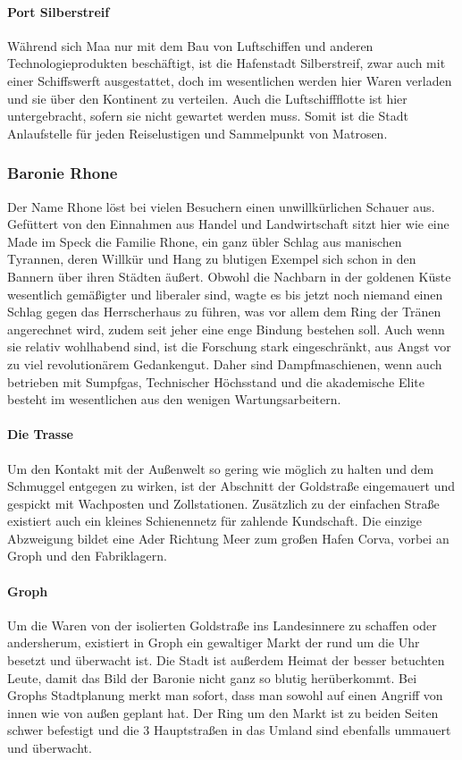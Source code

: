 \documentclass[a4paper,12pt,oneside]{book}
\begin{document}
\paragraph{Port Silberstreif}
Während sich Maa nur mit dem Bau von Luftschiffen und anderen Technologieprodukten beschäftigt, ist die Hafenstadt Silberstreif, zwar auch mit einer Schiffswerft ausgestattet, doch im wesentlichen werden hier Waren verladen und sie über den Kontinent zu verteilen. Auch die Luftschiffflotte ist hier untergebracht, sofern sie nicht gewartet werden muss. Somit ist die Stadt Anlaufstelle für jeden Reiselustigen und Sammelpunkt von Matrosen. 
\subsubsection{Baronie Rhone}
Der Name Rhone löst bei vielen Besuchern einen unwillkürlichen Schauer aus. Gefüttert von den Einnahmen aus Handel und Landwirtschaft sitzt hier wie eine Made im Speck die Familie Rhone, ein ganz übler Schlag aus manischen Tyrannen, deren Willkür und Hang zu blutigen Exempel sich schon in den Bannern über ihren Städten äußert. Obwohl die Nachbarn in der goldenen Küste wesentlich gemäßigter und liberaler sind, wagte es bis jetzt noch niemand einen Schlag gegen das Herrscherhaus zu führen, was vor allem dem Ring der Tränen angerechnet wird, zudem seit jeher eine enge Bindung bestehen soll. Auch wenn sie relativ wohlhabend sind, ist die Forschung stark eingeschränkt, aus Angst vor zu viel revolutionärem Gedankengut. Daher sind Dampfmaschienen, wenn auch betrieben mit Sumpfgas, Technischer Höchsstand und die akademische Elite besteht im wesentlichen aus den wenigen Wartungsarbeitern.
\paragraph{Die Trasse}
Um den Kontakt mit der Außenwelt so gering wie möglich zu halten und dem Schmuggel entgegen zu wirken, ist der Abschnitt der Goldstraße eingemauert und gespickt mit Wachposten und Zollstationen. Zusätzlich zu der einfachen Straße existiert auch ein kleines Schienennetz für zahlende Kundschaft. Die einzige Abzweigung bildet eine Ader Richtung Meer zum großen Hafen Corva, vorbei an Groph und den Fabriklagern.
\paragraph{Groph}
Um die Waren von der isolierten Goldstraße ins Landesinnere zu schaffen oder andersherum, existiert in Groph ein gewaltiger Markt der rund um die Uhr besetzt und überwacht ist. Die Stadt ist außerdem Heimat der besser betuchten Leute, damit das Bild der Baronie nicht ganz so blutig herüberkommt. Bei Grophs Stadtplanung merkt man sofort, dass man sowohl auf einen Angriff von innen wie von außen geplant hat. Der Ring um den Markt ist zu beiden Seiten schwer befestigt und die 3 Hauptstraßen in das Umland sind ebenfalls ummauert und überwacht.
\end{document}
